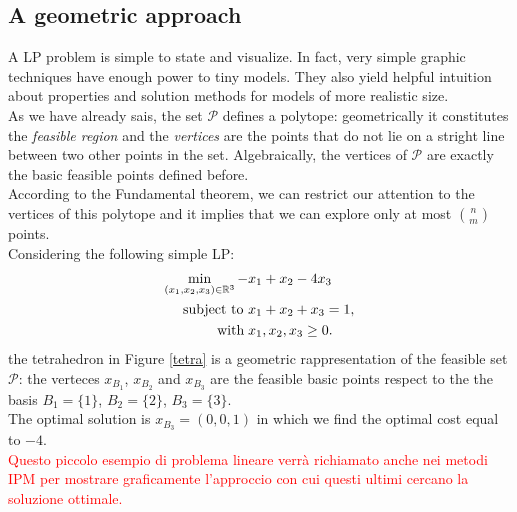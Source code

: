 \documentclass[a4paper,10 pt,titlepage,twoside]{book}
\theoremstyle{plain}
\theoremstyle{definition}
\theoremstyle{remark}
\begin{document}
\subsection*{A geometric approach}
A LP problem is simple to state and visualize. In fact, very simple graphic techniques have enough power to tiny models. They also yield helpful intuition about properties and solution methods for models of more realistic size.\\ As we have already sais, the set $\mathcal{P}$ defines a polytope: geometrically it constitutes the \textit{feasible region} and the \textit{vertices} are the points that do not lie on a stright line between two other points in the set. Algebraically, the vertices of $\mathcal{P}$ are exactly the basic feasible points defined before.\\ According to the Fundamental theorem, we can restrict our attention to the vertices of this polytope and it implies that we can explore only at most  ${n}\choose{m}$ points.\\[0.5cm]
Considering the following simple LP:
\begin{align*}
\min\limits_{(x_{1},x_{2},x_{3})\in\mathbb{R}^{3}} -&x_{1}+ x_{2}-4x_{3}\\
\text{subject to }&x_{1}+x_{2}+x_{3}=1,\\
 \text{\; with\;} &x_{1}, x_{2}, x_{3} \geq 0.
\end{align*}
the tetrahedron in Figure \ref{tetra} is a geometric rappresentation of the feasible set $\mathcal{P}$: the verteces ${x}_{B_{1}}$, ${x}_{B_{2}}$ and ${x}_{B_{3}}$ are the feasible basic points respect to the the basis $B_{1} =\{1\}$,  $B_{2} =\{2\}$,  $B_{3} =\{3\}$.\\ The optimal solution is ${x}_{B_{3}}=(0,0,1)$ in which we find the optimal cost equal to $-4$.\\
\textcolor{red}{Questo piccolo esempio di problema lineare verrà richiamato anche nei metodi IPM per mostrare graficamente l'approccio con cui questi ultimi cercano la soluzione ottimale.}
\end{document}
